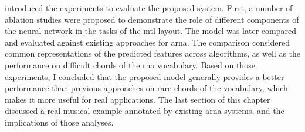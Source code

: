  introduced the experiments
to evaluate the proposed system. First, a number of ablation
studies were proposed to demonstrate the role of different
components of the neural network in the tasks of the
\gls{mtl} layout. The model was later compared and evaluated
against existing approaches for \gls{arna}. The comparison
considered common representations of the predicted features
across algorithms, as well as the performance on difficult
chords of the \gls{rna} vocabulary. Based on those
experiments, I concluded that the proposed model generally
provides a better performance than previous approaches on
rare chords of the vocabulary, which makes it more useful
for real applications. The last section of this chapter
discussed a real musical example annotated by existing
\gls{arna} systems, and the implications of those analyses.
